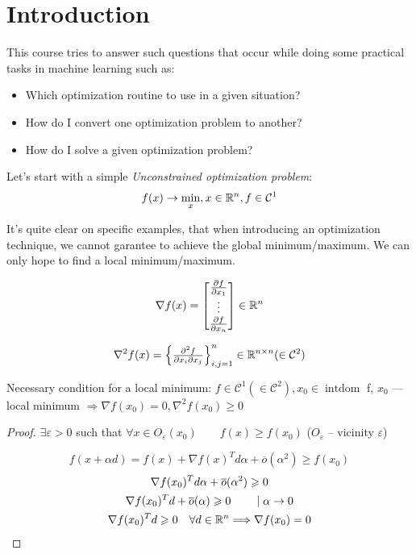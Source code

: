 \section{Introduction}
\label{sec:introduction}

This course tries to answer such questions that occur while doing some practical tasks in machine learning such as:
\begin{itemize}
  \item Which optimization routine to use in a given situation?
  \item How do I convert one optimization problem to another?
  \item How do I solve a given optimization problem?
\end{itemize}

\begin{definition} Let's start with a simple \textit{Unconstrained optimization problem}:
  $$
  f(x) \to \min_{x}, x \in \mathbb{R}^n, f \in \mathcal{C}^1
  $$
\end{definition}

It's quite clear on specific examples, that when introducing an optimization technique, we cannot garantee to achieve the global minimum/maximum. We can only hope to find a local minimum/maximum. 

$$
\nabla f(x) = \begin{bmatrix}
  \frac{\partial f}{\partial x_1} \\
  \vdots \\
  \frac{\partial f}{\partial x_n} 
\end{bmatrix} \in \mathbb{R}^n
$$

$$
\nabla^2 f(x) = \begin{Bmatrix} 
      \frac{\partial^2 f}{\partial x_i \partial x_j}
   \end{Bmatrix}^n_{i, j = 1} \in \mathbb{R}^{n \times n} (\in \mathcal{C}^2)
$$

\begin{theorem} Necessary condition for a local minimum:
  $f \in \mathcal{C}^1 (\in \mathcal{C}^2), x_0 \in \operatorname{int dom}$  f, $x_0$ --- local minimum $\Longrightarrow \nabla f(x_0) = 0, \nabla^2 f(x_0) \geqslant 0$
\end{theorem}
\begin{proof}
$\exists \varepsilon > 0$ such that $\forall x \in O_\varepsilon (x_0) \qquad f(x) \geqslant f(x_0)$ ($O_\varepsilon$ -- vicinity $\varepsilon$)

$$
f(x + \alpha d) = f(x) + \nabla f(x)^T d \alpha + \overline{o} (\alpha^2) \geqslant f(x_0)
$$
\begin{gather*}
  \nabla f(x_0)^T d \alpha + \overline{o} (\alpha^2) \geqslant 0 \\
  \nabla f(x_0)^T d + \overline{o} (\alpha) \geqslant 0 \qquad \mid \alpha \to 0 \\ 
  \nabla f(x_0)^T d \geqslant 0 \quad \forall d \in \mathbb{R}^n \Longrightarrow \nabla f(x_0) = 0
\end{gather*}

\end{proof}

